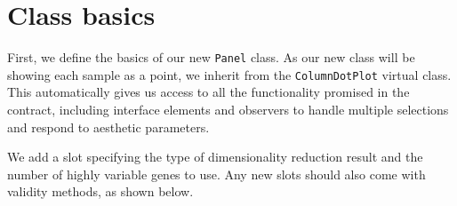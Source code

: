 \documentclass[
]{book}
\newenvironment{Shaded}{\begin{snugshade}}{\end{snugshade}}
\newcommand{\ControlFlowTok}[1]{\textcolor[rgb]{0.13,0.29,0.53}{\textbf{#1}}}
\newcommand{\DecValTok}[1]{\textcolor[rgb]{0.00,0.00,0.81}{#1}}
\newcommand{\KeywordTok}[1]{\textcolor[rgb]{0.13,0.29,0.53}{\textbf{#1}}}
\newcommand{\NormalTok}[1]{#1}
\newcommand{\OperatorTok}[1]{\textcolor[rgb]{0.81,0.36,0.00}{\textbf{#1}}}
\newcommand{\OtherTok}[1]{\textcolor[rgb]{0.56,0.35,0.01}{#1}}
\newcommand{\StringTok}[1]{\textcolor[rgb]{0.31,0.60,0.02}{#1}}
\begin{document}
\hypertarget{class-basics}{%
\section{Class basics}\label{class-basics}}

First, we define the basics of our new \texttt{Panel} class.
As our new class will be showing each sample as a point, we inherit from the \texttt{ColumnDotPlot} virtual class.
This automatically gives us access to all the functionality promised in the contract,
including interface elements and observers to handle multiple selections and respond to aesthetic parameters.

We add a slot specifying the type of dimensionality reduction result and the number of highly variable genes to use.
Any new slots should also come with validity methods, as shown below.

\begin{Shaded}
\end{Shaded}
\end{document}

